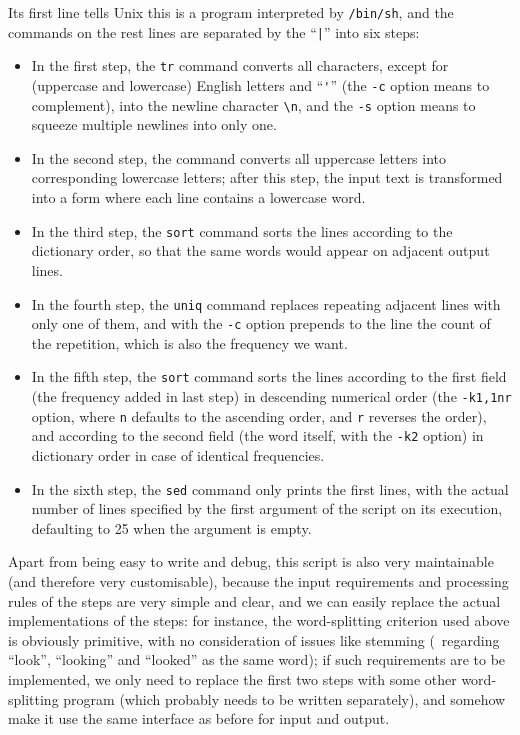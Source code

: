 Its first line tells Unix this is a program interpreted by \verb|/bin/sh|,
and the commands on the rest lines are separated by the
 ``\verb/|/'' into six steps:
\begin{itemize}
\item In the first step, the \verb|tr| command converts all
	characters, except for (uppercase and lowercase) English
	letters and ``\verb|'|'' (the \verb|-c| option means to complement),
	into the newline character \verb|\n|, and the \verb|-s| option
	means to squeeze multiple newlines into only one.
\item In the second step, the command converts all uppercase letters into
	corresponding lowercase letters; after this step, the input text is
	transformed into a form where each line contains a lowercase word.
\item In the third step, the \verb|sort| command sorts the lines according
	to the dictionary order, so that the same words would appear on
	adjacent output lines.
\item In the fourth step, the \verb|uniq| command replaces repeating adjacent
	lines with only one of them, and with the \verb|-c| option prepends to the
	line the count of the repetition, which is also the frequency we want.
\item In the fifth step, the \verb|sort| command sorts the lines according to
	the first field (the frequency added in last step) in descending numerical
	order (the \verb|-k1,1nr| option, where \verb|n| defaults to the
	ascending order, and \verb|r| reverses the order), and according
	to the second field (the word itself, with the \verb|-k2| option)
	in dictionary order in case of identical frequencies.
\item In the sixth step, the \verb|sed| command only prints the first lines,
	with the actual number of lines specified by the first argument of the
	script on its execution, defaulting to 25 when the argument is empty.
\end{itemize}
Apart from being easy to write and debug, this script is also very maintainable
(and therefore very customisable), because the input requirements and processing
rules of the steps are very simple and clear, and we can easily replace the
actual implementations of the steps: for instance, the word-splitting criterion
used above is obviously primitive, with no consideration of issues like
stemming (\eg~regarding ``look'', ``looking'' and ``looked'' as the
same word); if such requirements are to be implemented, we only need
to replace the first two steps with some other word-splitting program
(which probably needs to be written separately), and somehow make
it use the same interface as before for input and output.

